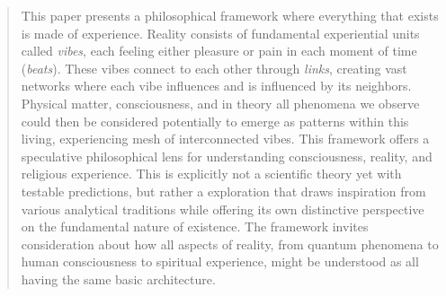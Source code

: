\begin{abstract}
This paper presents a philosophical framework where everything that exists is made of experience. Reality consists of fundamental experiential units called \emph{vibes}, each feeling either pleasure or pain in each moment of time (\emph{beats}). These vibes connect to each other through \emph{links}, creating vast networks where each vibe influences and is influenced by its neighbors. Physical matter, consciousness, and in theory all phenomena we observe could then be considered potentially to emerge as patterns within this living, experiencing mesh of interconnected vibes. This framework offers a speculative philosophical lens for understanding consciousness, reality, and religious experience. This is explicitly not a scientific theory yet with testable predictions, but rather a exploration that draws inspiration from various analytical traditions while offering its own distinctive perspective on the fundamental nature of existence. The framework invites consideration about how all aspects of reality, from quantum phenomena to human consciousness to spiritual experience, might be understood as all having the same basic architecture.
\end{abstract}
